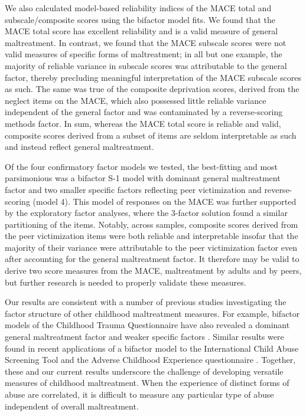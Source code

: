 \documentclass[letterpaper,man,natbib]{apa6}  %
\begin{document}
We also calculated model-based reliability indices of the MACE total and subscale/composite scores using the bifactor model fits. We found that the MACE total score has excellent reliability and is a valid measure of general maltreatment. In contrast, we found that the MACE subscale scores were not valid measures of specific forms of maltreatment; in all but one example, the majority of reliable variance in subscale scores was attributable to the general factor, thereby precluding meaningful interpretation of the MACE subscale scores as such. The same was true of the composite deprivation scores, derived from the neglect items on the MACE, which also possessed little reliable variance independent of the general factor and was contaminated by a reverse-scoring methods factor. In sum, whereas the MACE total score is reliable and valid, composite scores derived from a subset of items are seldom interpretable as such and instead reflect general maltreatment.  

Of the four confirmatory factor models we tested, the best-fitting and most parsimonious was a bifactor S-1 model with dominant general maltreatment factor and two smaller specific factors reflecting peer victimization and reverse-scoring (model 4). This model of responses on the MACE was further supported by the exploratory factor analyses, where the 3-factor solution found a similar partitioning of the items. Notably, across samples, composite scores derived from the peer victimization items were both reliable and interpretable insofar that the majority of their variance were attributable to the peer victimization factor even after accounting for the general maltreatment factor. It therefore may be valid to derive two score measures from the MACE, maltreatment by adults and by peers, but further research is needed to properly validate these measures.

Our results are consistent with a number of previous studies investigating the factor structure of other childhood maltreatment measures. For example, bifactor models of the Childhood Trauma Questionnaire have also revealed a dominant general maltreatment factor and weaker specific factors \citep{spinhoven2014childhood, hollerbach2018main, stagaki2022mediating}. Similar results were found in recent applications of a bifactor model to the International Child Abuse Screening Tool \citep{meinck2021factor} and the Adverse Childhood Experience questionnaire \citep{dobson2021latent}. Together, these and our current results underscore the challenge of developing versatile measures of childhood maltreatment. When the experience of distinct forms of abuse are correlated, it is difficult to measure any particular type of abuse independent of overall maltreatment.  
 
\end{document}
